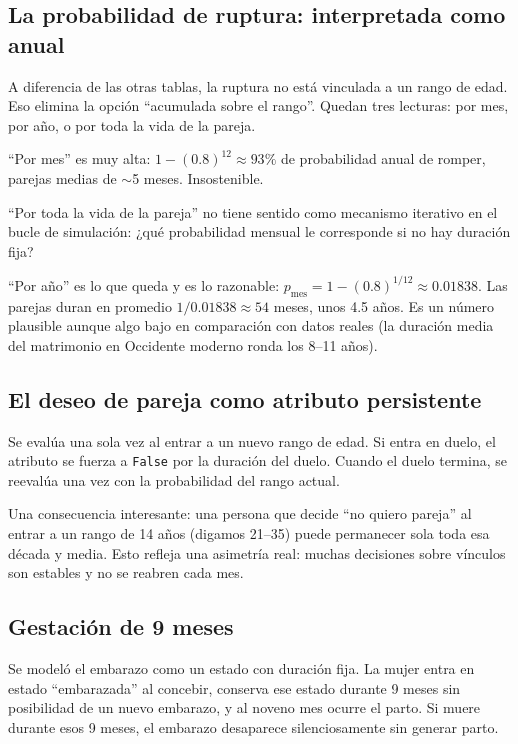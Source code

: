 \documentclass[12pt,a4paper]{article}
\begin{document}
\subsection{La probabilidad de ruptura: interpretada como anual}

A diferencia de las otras tablas, la ruptura no está vinculada a un rango de edad. Eso elimina la opción ``acumulada sobre el rango''. Quedan tres lecturas: por mes, por año, o por toda la vida de la pareja.

``Por mes'' es muy alta: $1 - (0.8)^{12} \approx 93\%$ de probabilidad anual de romper, parejas medias de $\sim$5 meses. Insostenible.

``Por toda la vida de la pareja'' no tiene sentido como mecanismo iterativo en el bucle de simulación: ¿qué probabilidad mensual le corresponde si no hay duración fija?

``Por año'' es lo que queda y es lo razonable: $p_{\text{mes}} = 1 - (0.8)^{1/12} \approx 0.01838$. Las parejas duran en promedio $1/0.01838 \approx 54$ meses, unos 4.5 años. Es un número plausible aunque algo bajo en comparación con datos reales (la duración media del matrimonio en Occidente moderno ronda los 8--11 años).

\subsection{El deseo de pareja como atributo persistente}

Se evalúa una sola vez al entrar a un nuevo rango de edad. Si entra en duelo, el atributo se fuerza a \texttt{False} por la duración del duelo. Cuando el duelo termina, se reevalúa una vez con la probabilidad del rango actual.

Una consecuencia interesante: una persona que decide ``no quiero pareja'' al entrar a un rango de 14 años (digamos 21--35) puede permanecer sola toda esa década y media. Esto refleja una asimetría real: muchas decisiones sobre vínculos son estables y no se reabren cada mes.

\subsection{Gestación de 9 meses}

Se modeló el embarazo como un estado con duración fija. La mujer entra en estado ``embarazada'' al concebir, conserva ese estado durante 9 meses sin posibilidad de un nuevo embarazo, y al noveno mes ocurre el parto. Si muere durante esos 9 meses, el embarazo desaparece silenciosamente sin generar parto.
\end{document}
